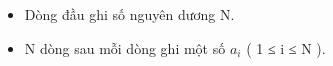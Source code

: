 \begin{itemize}
	\item     Dòng đầu ghi số nguyên dương N.   
	\item     N dòng sau mỗi dòng ghi một số $a_{i}$    ( 1 ≤ i ≤ N ).   
\end{itemize}